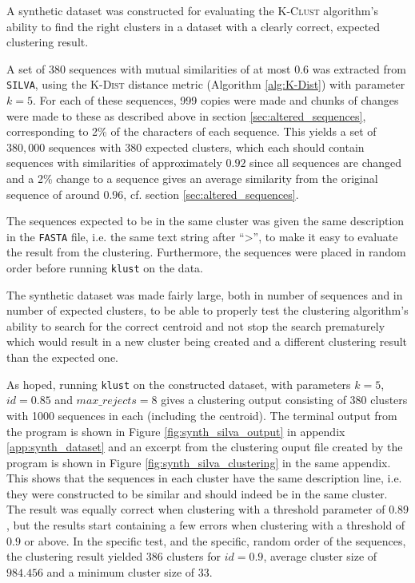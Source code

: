 A synthetic dataset was constructed for evaluating the \textsc{K-Clust}
algorithm's ability to find the right clusters in a dataset with a clearly
correct, expected clustering result.

A set of 380 sequences with mutual similarities of at most 0.6 was extracted
from \texttt{SILVA}, using the \textsc{K-Dist} distance metric (Algorithm
\ref{alg:K-Dist}) with parameter $k=5$. For each of these sequences, 999 copies
were made and chunks of changes were made to these as described above in
section \ref{sec:altered_sequences}, corresponding to 2\% of the characters of
each sequence. This yields a set of $380,000$ sequences with 380 expected
clusters, which each should contain sequences with similarities of
approximately $0.92$ since all sequences are changed and a 2\% change to a
sequence gives an average similarity from the original sequence of around
$0.96$, cf. section \ref{sec:altered_sequences}.

The sequences expected to be in the same cluster was given the same description
in the \texttt{FASTA} file, i.e. the same text string after ``>'', to make it
easy to evaluate the result from the clustering. Furthermore, the sequences
were placed in random order before running \texttt{klust} on the data.

The synthetic dataset was made fairly large, both in number of sequences and in
number of expected clusters, to be able to properly test the clustering
algorithm's ability to search for the correct centroid and not stop the search
prematurely which would result in a new cluster being created and a different
clustering result than the expected one.

As hoped, running \texttt{klust} on the constructed dataset, with parameters
$k=5$, $id=0.85$ and $max\_rejects=8$ gives a clustering output consisting of
380 clusters with 1000 sequences in each (including the centroid). The terminal
output from the program is shown in Figure \ref{fig:synth_silva_output} in
appendix \ref{app:synth_dataset} and an excerpt from the clustering ouput file
created by the program is shown in Figure \ref{fig:synth_silva_clustering} in
the same appendix. This shows that the sequences in each cluster have the same
description line, i.e. they were constructed to be similar and should indeed be
in the same cluster. The result was equally correct when clustering with a
threshold parameter of $0.89$, but the results start containing a few errors
when clustering with a threshold of $0.9$ or above. In the specific test, and
the specific, random order of the sequences, the clustering result yielded 386
clusters for $id=0.9$, average cluster size of $984.456$ and a minimum cluster
size of $33$.

